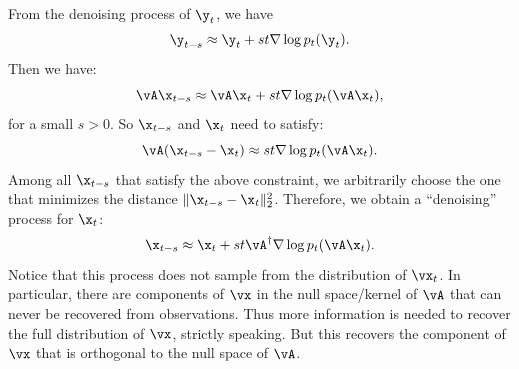 \documentclass[../../book-main.tex]{subfiles}
\begin{document}
From the denoising process of $\y_t$, we have
\begin{equation}
    \y_{t-s} \approx  \y_t + st \nabla \log p_t(\y_t).
\end{equation}
Then we have:
\begin{equation}
    \vA\x_{t-s} \approx   \vA\x_t + st \nabla \log p_t(\vA \x_t),
\end{equation}
for a small $s >0$. So $\x_{t-s}$ and $\x_t$ need to satisfy:
\begin{equation}
    \vA(\x_{t-s} - \x_t) \approx st \nabla \log p_t(\vA\x_t).
\end{equation}
Among all $\x_{t-s}$ that satisfy the above constraint, we
arbitrarily choose the one that minimizes the distance $\|\x_{t-s} -
\x_t\|_2^2$. Therefore, we obtain a ``denoising'' process for $\x_t$:
\begin{equation}
    \x_{t-s}  \approx \x_t + st\vA^\dagger \nabla \log p_t(\vA\x_t).
    \label{eqn:denoising-projection}
\end{equation}
Notice that this process does not sample from the distribution of
$\vx_t$. In particular, there are components of $\vx$ in the null
space/kernel of $\vA$ that can never be recovered from observations.
Thus more information is needed to recover the full distribution of
$\vx$, strictly speaking. But this recovers the component of $\vx$
that is orthogonal to the null space of $\vA$.
\end{document}
